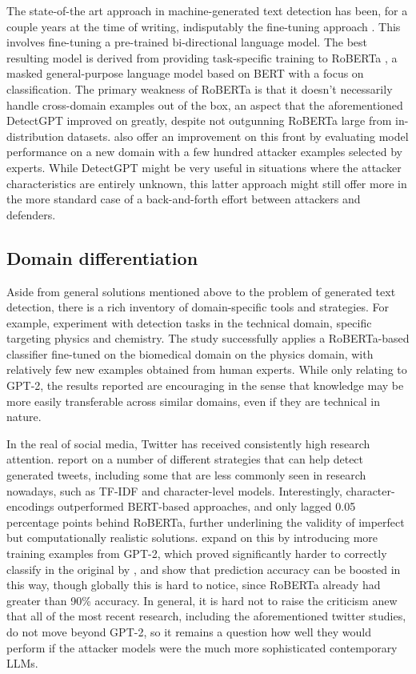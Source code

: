 The state-of-the art approach in machine-generated text detection has been, for a couple years at the time of writing, indisputably the fine-tuning approach \citep{solaiman2019release}.
This involves fine-tuning a pre-trained bi-directional language model.
The best resulting model is derived from providing task-specific training to RoBERTa \citep{liu2019roberta}, a masked general-purpose language model based on BERT \citep{devlin2019bertpretrainingdeepbidirectional} with a focus on classification.
The primary weakness of RoBERTa is that it doesn't necessarily handle cross-domain examples out of the box, an aspect that the aforementioned DetectGPT \citep{mitchell2023detectgpt} improved on greatly, despite not outgunning RoBERTa large from in-distribution datasets.
\citet{rodriguez2022cross} also offer an improvement on this front by evaluating model performance on a new domain with a few hundred attacker examples selected by experts.
While DetectGPT might be very useful in situations where the attacker characteristics are entirely unknown, this latter approach might still offer more in the more standard case of a back-and-forth effort between attackers and defenders.

\subsection{Domain differentiation}

Aside from general solutions mentioned above to the problem of generated text detection, there is a rich inventory of domain-specific tools and strategies.
For example, \citet{rodriguez2022cross} experiment with detection tasks in the technical domain, specific targeting physics and chemistry.
The study successfully applies a RoBERTa-based classifier fine-tuned on the biomedical domain on the physics domain, with relatively few new examples obtained from human experts.
While only relating to GPT-2, the results reported are encouraging in the sense that knowledge may be more easily transferable across similar domains, even if they are technical in nature.

In the real of social media, Twitter has received consistently high research attention.
\citet{fagni2021tweepfake} report on a number of different strategies that can help detect generated tweets, including some that are less commonly seen in research nowadays, such as TF-IDF and character-level models.
Interestingly, character-encodings outperformed BERT-based approaches, and only lagged 0.05 percentage points behind RoBERTa, further underlining the validity of imperfect but computationally realistic solutions.
\citet{tourille2022automatic} expand on this by introducing more training examples from GPT-2, which proved significantly harder to correctly classify in the original by \citet{fagni2021tweepfake}, and show that prediction accuracy can be boosted in this way, though globally this is hard to notice, since RoBERTa already had greater than 90\% accuracy.
In general, it is hard not to raise the criticism anew that all of the most recent research, including the aforementioned twitter studies, do not move beyond GPT-2, so it remains a question how well they would perform if the attacker models were the much more sophisticated contemporary LLMs.

